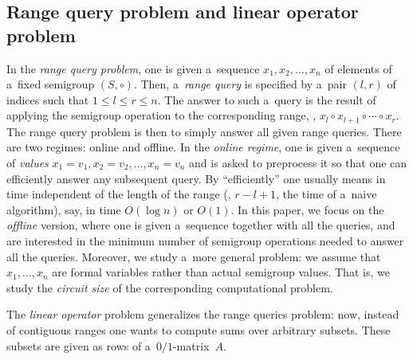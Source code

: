%
%
%

%
%


%
%
\subsection{Range query problem and linear operator problem}
%
%
In the \emph{range query problem},
one is given
a~sequence $x_1, x_2, \dotsc, x_n$ of
elements of a~fixed semigroup $(S, \circ)$.
Then, a~\emph{range query} is
specified by a~pair %
$(l,r)$ of indices  %
such that $1 \le l \le r \le n$.
The answer to such a~query is the result of applying the semigroup
operation to the
corresponding range, \ie, $x_l \circ x_{l+1} \circ \dotsb \circ x_r$.
%
%
The range query problem
is then to simply answer all given range
queries.
There are two
regimes: online and offline. In the \emph{online regime}, one is given
a~sequence of \emph{values}
$x_1=v_1, x_2=v_2, \dotsc, x_n=v_n$ and is asked to preprocess
it %
so that one can   %
%
efficiently answer  %
any subsequent query.
By ``efficiently'' one usually
means in time independent of the length of the range
(\ie, $r-l+1$, the time
of a~naive algorithm), say, in time $O(\log n)$ or $O(1)$.
In this paper, we
focus on the \emph{offline} version, where one is given a~sequence
together with
all the queries, and are interested in the minimum number of
semigroup
operations needed to answer all the queries. Moreover, we study
a~more general
problem: we assume that $x_1, \dotsc, x_n$ are formal variables
rather than
actual semigroup values. That is, we study the \emph{circuit size} of
the corresponding
computational problem.

The \emph{linear operator} problem generalizes the range
queries problem: now, instead of contiguous ranges one wants
to compute sums over arbitrary subsets. These subsets are
given as rows of a~$0/1$-matrix~$A$.  %

